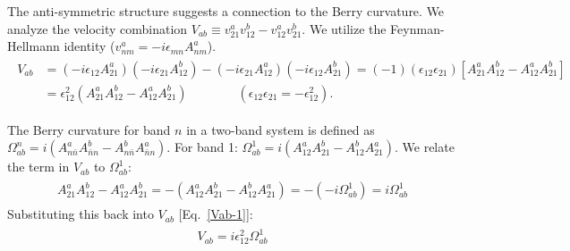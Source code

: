 \documentclass[twocolumn, prx, reprint, amsfonts, amsmath, amssymb, longbibliography, floatfix, aps]{revtex4-2}
\begin{document}
The anti-symmetric structure suggests a connection to the Berry curvature. We analyze the velocity combination $V_{ab} \equiv v_{21}^a v_{12}^b - v_{12}^a v_{21}^b$. We utilize the Feynman-Hellmann identity ($v_{nm}^a = -i \epsilon_{mn} A_{nm}^a$).
\begin{align}
\begin{aligned}
V_{ab} &= (-i\epsilon_{12} A_{21}^a)(-i\epsilon_{21} A_{12}^b) - (-i\epsilon_{21} A_{12}^a)(-i\epsilon_{12} A_{21}^b) = (-1)(\epsilon_{12}\epsilon_{21}) [ A_{21}^a A_{12}^b - A_{12}^a A_{21}^b ] \\
&= \epsilon_{12}^2 (A_{21}^a A_{12}^b - A_{12}^a A_{21}^b) 
\qquad \qquad
(\epsilon_{12}\epsilon_{21} = -\epsilon_{12}^2) .
\label{Vab-1}
\end{aligned}
\end{align}

The Berry curvature for band $n$ in a two-band system is defined as $\Omega_{ab}^n = i (A_{n\bar{n}}^a A_{\bar{n}n}^b - A_{n\bar{n}}^b A_{\bar{n}n}^a)$.
For band 1: $\Omega_{ab}^1 = i (A_{12}^a A_{21}^b - A_{12}^b A_{21}^a)$.
We relate the term in $V_{ab}$ to $\Omega_{ab}^1$:
\begin{align}
\begin{aligned}
A_{21}^a A_{12}^b - A_{12}^a A_{21}^b = -(A_{12}^a A_{21}^b - A_{12}^b A_{21}^a) = -(-i \Omega_{ab}^1) = i \Omega_{ab}^1
\end{aligned}
\end{align}
Substituting this back into $V_{ab}$ [Eq.~\eqref{Vab-1}]:
\begin{align}
\begin{aligned}
V_{ab} = i \epsilon_{12}^2 \Omega_{ab}^1
\end{aligned}
\end{align}
\end{document}
